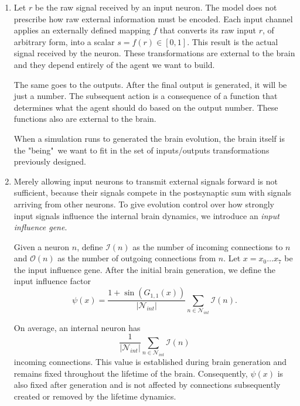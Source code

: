 \documentclass[12pt,a4paper]{article}
\begin{document}
\begin{enumerate}
	Note that $n(u, v, w)$ may be an output neuron, so it is possible to form new connections between internal neurons and output neurons. However, it is not possible to form new connections between input neurons and internal neurons by this procedure.
	
	\item Let $r$ be the raw signal received by an input neuron. 	The model does not prescribe how raw external information must be encoded. Each input channel applies an externally defined mapping $f$ that converts its raw input $r$, of arbitrary form, into a scalar $s = f(r) \in [0,1]$. This result is the actual signal received by the neuron. These transformations are external to the brain and they depend entirely of the agent we want to build. 
	
	The same goes to the outputs. After the final output is generated, it will be just a number. The subsequent action is a consequence of a function that determines what the agent should do based on the output number. These functions also are external to the brain. 
	
	When a simulation runs to generated the brain evolution, the brain itself is the "being"\ we want to fit in the set of inputs/outputs transformations previously designed. 
	
	\item Merely allowing input neurons to transmit external signals forward is not sufficient, because their signals compete in the postsynaptic sum with signals arriving from other neurons. To give evolution control over how strongly input signals influence the internal brain dynamics, we introduce an \emph{input influence gene}.

	Given a neuron $n$, define $\mathcal{I}(n)$ as the number of incoming connections to $n$ and $\mathcal{O}(n)$ as the number of outgoing connections from $n$. Let $x=x_0\ldots x_7$ be the input influence gene. After the initial brain generation, we define the input influence factor
	$$\psi(x) = \frac{1 + \sin\left(G_{1,1}(x)\right)}{|\mathcal{N}_{int}|} \sum_{n \in \mathcal{N}_{int}}\mathcal{I}(n).$$

	On average, an internal neuron has
	$$\frac{1}{|\mathcal{N}_{int}|} \sum_{n \in \mathcal{N}_{int}}\mathcal{I}(n)$$
incoming connections. This value is established during brain generation and remains fixed throughout the lifetime of the brain. Consequently, $\psi(x)$ is also fixed after generation and is not affected by connections subsequently created or removed by the lifetime dynamics.


\end{enumerate}
\end{document}
